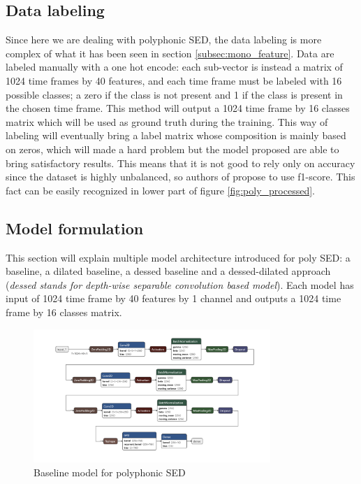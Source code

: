 \documentclass{article}
\begin{document}
\subsection{Data labeling}
\label{subsec:poly_label}

Since here we are dealing with polyphonic SED, the data labeling is more complex of what it has been seen in section \ref{subsec:mono_feature}. Data are labeled manually with a one hot encode: each sub-vector is instead a matrix of 1024 time frames by 40 features, and each time frame must be labeled with 16 possible classes; a zero if the class is not present and 1 if the class is present in the chosen time frame. This method will output a 1024 time frame by 16 classes matrix which will be used as ground truth during the training. This way of labeling will eventually bring a label matrix whose composition is mainly based on zeros, which will made a hard problem but the model proposed are able to bring satisfactory results. This means that it is not good to rely only on accuracy since the dataset is highly unbalanced, so authors of \cite{drossos2020sound} propose to use f1-score. This fact can be easily recognized in lower part of figure \ref{fig:poly_processed}.

\subsection{Model formulation}
\label{subsec:poly_model}

This section will explain multiple model architecture introduced for poly SED: a baseline, a dilated baseline, a dessed baseline and a dessed-dilated approach (\textit{dessed stands for depth-wise separable convolution based model}). Each model has input of 1024 time frame by 40 features by 1 channel and outputs a 1024 time frame by 16 classes matrix.

\begin{figure}[H]
	\centering
	\includegraphics[width=0.8\textwidth]{./images/poly/baseline.png}	
	\caption{Baseline model for polyphonic SED}
	\label{fig:poly_baseline}
\end{figure}
\end{document}
